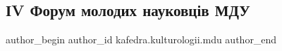  
 
 
 
 

\subsection{ІV Форум молодих науковців МДУ}
\label{sec:18_05_2023.fb.kafedra.kulturologii.mdu.1.iv_forum_molodyh_naukovciv_mdu}

\ifcmt
 author_begin
   author_id kafedra.kulturologii.mdu
 author_end
\fi
